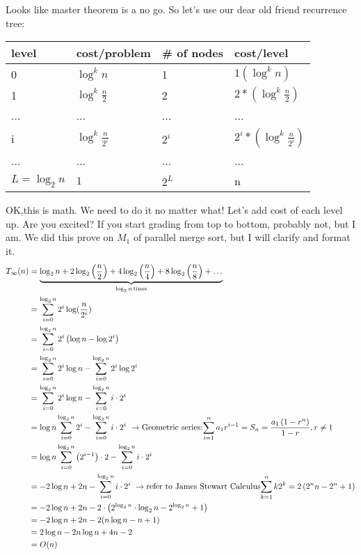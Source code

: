 \documentclass{article}
\begin{document}
Looks like master theorem is a no go. So let's use our dear old friend recurrence tree: 

\begin{tabu}  { | X[c] | X[c] | X[c] | X[c]|}
    \hline
        level&cost/problem&\# of nodes & cost/level \\
        &$\log ^{k} n$&1&$1(\log ^{k} n)$ \\
    &$\log ^{k} \frac{n}{2}$&2&$2*(\log ^{k} \frac{n}{2})$ \\
    \hline
        ...&...&...&... \\
    \hline 
        i&$\log ^{k} \frac{n}{2^i}$& $2^i$ & $2^i*(\log ^{k} \frac{n}{2^i})$ \\
    \hline
         ...&...&...&... \\
    \hline
        $L=\log_{2}n$ &$1$& $2^L$ & n  \\
    \hline
    
\end{tabu}

OK,this is math. We need to do it no matter what! Let's add cost of each level up. Are you excited? If you start grading from top to bottom, probably not, but I am. We did this prove on $M_1$ of parallel merge sort, but I will clarify and format it. 
\begin{equation*}
    \begin{split}
       T_\infty(n)&=\underbrace{\log _{2} n+2 \log _{2}\left(\frac{n}{2}\right)+4 \log _{2}\left(\frac{n}{4}\right)+8 \log _{2}\left(\frac{n}{8}\right)+\ldots}_{\log _{2} n \operatorname{tines}}\\
       &=\sum_{i=0}^{\log_{2}n} 2^i \log (\frac{n}{2^i})\\
       &=\sum_{i=0}^{\log _{2} n} 2^{i}\left(\log n-\log 2^{i}\right)\\
       &=\sum_{i=0}^{\log _{2} n} 2^{i} \log n-\sum_{i=0}^{\log _{2} n} 2^{i} \log 2^{i}\\
       &=\sum_{i=0}^{\log _{2} n} 2^{i} \log n -\sum_{i=0}^{\log _{2} n} i \cdot 2^{i}\\
       &=\log n\sum_{i=0}^{\log _{2} n} 2^{i}-\sum_{i=0}^{\log _{2} n} i \cdot 2^{i}
       \ \rightarrow\text{Geometric series:$
\sum_{i=1}^{n} a_{1} r^{i-1}=S_{n}=\frac{a_{1}\left(1-r^{n}\right)}{1-r} , r \neq 1
$}\\
       &= \log n \sum_{i=0}^{\log _{2} n}\left(2^{i-1}\right) \cdot 2-\sum_{i=0}^{\log _{2} n} i \cdot 2^{i}\\
       &= -2\log n +2n -\sum_{i=0}^{\log _{2} n} i \cdot 2^{i} \ \rightarrow\text{refer to James Stewart Calculus$\sum_{k=1}^{n} k 2^{k}=2\left(2^{n} n-2^{n}+1\right)$}\\
       &=-2\log n +2n-2 \cdot\left(2^{\log _{2} n} \cdot \log _{2} n-2^{\log _{2} n}+1\right)\\
       &=-2\log n +2n-2( n \log n-n+1)\\
       &=2\log n -2n\log n +4n -2 \\
       &=O(n)\\
    \end{split}
\end{equation*}
 
    
\end{document}
